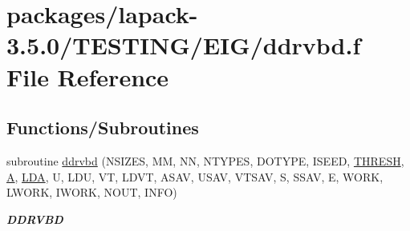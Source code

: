 \hypertarget{ddrvbd_8f}{}\section{packages/lapack-\/3.5.0/\+T\+E\+S\+T\+I\+N\+G/\+E\+I\+G/ddrvbd.f File Reference}
\label{ddrvbd_8f}
\subsection*{Functions/\+Subroutines}
\begin{DoxyCompactItemize}
\item 
subroutine \hyperlink{group__double__eig_ga154b2caeffc955bb3dede4c310ca3cd6}{ddrvbd} (N\+S\+I\+Z\+E\+S, M\+M, N\+N, N\+T\+Y\+P\+E\+S, D\+O\+T\+Y\+P\+E, I\+S\+E\+E\+D, \hyperlink{zlaqgs_8c_a0656018abfc9fa2821827415f5d5ea57}{T\+H\+R\+E\+S\+H}, \hyperlink{classA}{A}, \hyperlink{example__user_8c_ae946da542ce0db94dced19b2ecefd1aa}{L\+D\+A}, U, L\+D\+U, V\+T, L\+D\+V\+T, A\+S\+A\+V, U\+S\+A\+V, V\+T\+S\+A\+V, S, S\+S\+A\+V, E, W\+O\+R\+K, L\+W\+O\+R\+K, I\+W\+O\+R\+K, N\+O\+U\+T, I\+N\+F\+O)
\begin{DoxyCompactList}\small\item\em {\bfseries D\+D\+R\+V\+B\+D} \end{DoxyCompactList}\end{DoxyCompactItemize}
